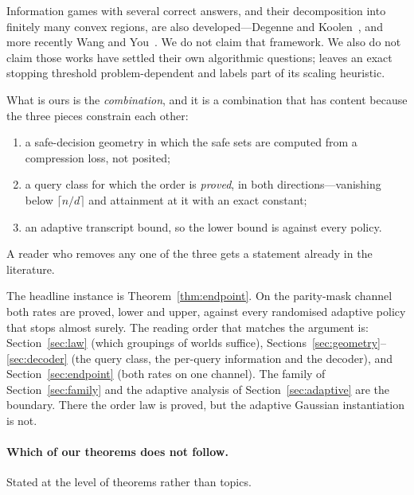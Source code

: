 Information games with several correct answers, and their decomposition into finitely many
convex regions, are also developed---Degenne and Koolen~\cite{degenne2019}, and more
recently Wang and You~\cite{wangyou2026}. We do not claim that framework. We also do not
claim those works have settled their own algorithmic questions; \cite{wangyou2026} leaves an
exact stopping threshold problem-dependent and labels part of its scaling heuristic.

What is ours is the \emph{combination}, and it is a combination that has content because the
three pieces constrain each other:
\begin{enumerate}
\item[1)] a safe-decision geometry in which the safe sets are computed from a compression
loss, not posited;
\item[2)] a query class for which the order is \emph{proved}, in both directions---vanishing
below $\lceil n/d\rceil$ and attainment at it with an exact constant;
\item[3)] an adaptive transcript bound, so the lower bound is against every policy.
\end{enumerate}
A reader who removes any one of the three gets a statement already in the literature.

The headline instance is Theorem~\ref{thm:endpoint}. On the parity-mask channel both rates
are proved, lower and upper, against every randomised adaptive policy that stops almost
surely. The reading order that matches the argument is: Section~\ref{sec:law} (which
groupings of worlds suffice), Sections~\ref{sec:geometry}--\ref{sec:decoder} (the query
class, the per-query information and the decoder), and Section~\ref{sec:endpoint} (both
rates on one channel). The family of Section~\ref{sec:family} and the adaptive analysis of
Section~\ref{sec:adaptive} are the boundary. There the order law is proved, but the adaptive
Gaussian instantiation is not.



\paragraph{Which of our theorems does not follow.}
Stated at the level of theorems rather than topics.

